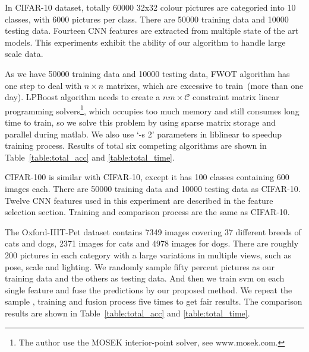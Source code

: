 \documentclass[letterpaper]{article}
\def\calC{{\mathcal{C}}}
\begin{document}

In CIFAR-10 dataset, totally 60000 32x32 colour pictures are categoried into 10 classes, with 6000 pictures per class.
There are 50000 training data and 10000 testing data.
Fourteen CNN features are extracted from multiple state of the art models.
This experiments exhibit the ability of our algorithm to handle large scale data.

As we have 50000 training data and 10000 testing data,
FWOT algorithm has one step to deal with $n\times n$ matrixes, which are excessive to train~(more than one day).
LPBoost algorithm needs to create a $nm\times \calC$ constraint matrix linear programming solvers\footnote{The author use the MOSEK interior-point solver, see www.mosek.com.},
which occupies too much memory and still consumes long time to train, so we solve this problem by using sparse matrix storage and parallel during matlab.
We also use `-s 2' parameters in liblinear to speedup training process.
Results of total six competing algorithms are shown in Table~\ref{table:total_acc} and \ref{table:total_time}.



CIFAR-100 is similar with CIFAR-10, except it has 100 classes containing 600 images each.
There are 50000 training data and 10000 testing data as CIFAR-10.
Twelve CNN features used in this experiment are described in the feature selection section.
Training and comparison process are the same as CIFAR-10.




The Oxford-IIIT-Pet dataset contains 7349 images covering 37 different breeds of cats and dogs, 2371 images for cats and 4978 images for dogs.
There are roughly 200 pictures in each category with a large variations in multiple views, such as pose, scale and lighting.
We randomly sample fifty percent pictures as our training data and the others as testing data.
And then we train svm on each single feature and fuse the predictions by our proposed method.
We repeat the sample , training and fusion process five times to get fair results.
The comparison results are shown in Table~\ref{table:total_acc} and \ref{table:total_time}.
\end{document}
